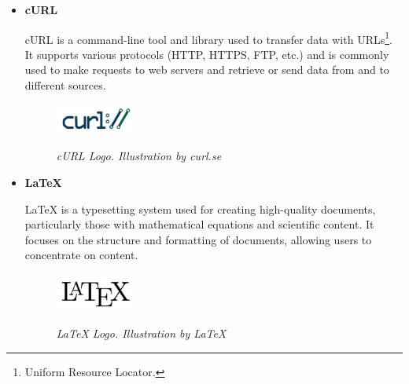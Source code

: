 \begin{itemize}
  \item \textbf{cURL}

    cURL is a command-line tool and library used to transfer data with URLs\footnote{Uniform Resource Locator.}.
    It supports various protocols (HTTP, HTTPS, FTP, etc.) and is commonly used
    to make requests to web servers and retrieve or send data from and to
    different sources.

    \begin{figure}[H]
      \centering
      \begin{adjustbox}{trim=0cm 0cm, clip}
        \includegraphics[width=0.25\textwidth]{imatges/studies_and_decisions/curl-logo.png}
      \end{adjustbox}
      \caption[cURL Logo]{\textit{cURL Logo. Illustration by curl.se}}
      {\label{fig:curl-logo}}
    \end{figure}

  \item \textbf{LaTeX}

    LaTeX is a typesetting system used for creating high-quality documents,
    particularly those with mathematical equations and scientific content. It
    focuses on the structure and formatting of documents, allowing users to
    concentrate on content.

    \begin{figure}[H]
      \centering
      \begin{adjustbox}{trim=0cm 0cm, clip}
        \includegraphics[width=0.25\textwidth]{imatges/studies_and_decisions/latex-logo.png}
      \end{adjustbox}
      \caption[LaTeX Logo]{\textit{LaTeX Logo. Illustration by LaTeX}}
      {\label{fig:latex-logo}}
    \end{figure}
\end{itemize}
